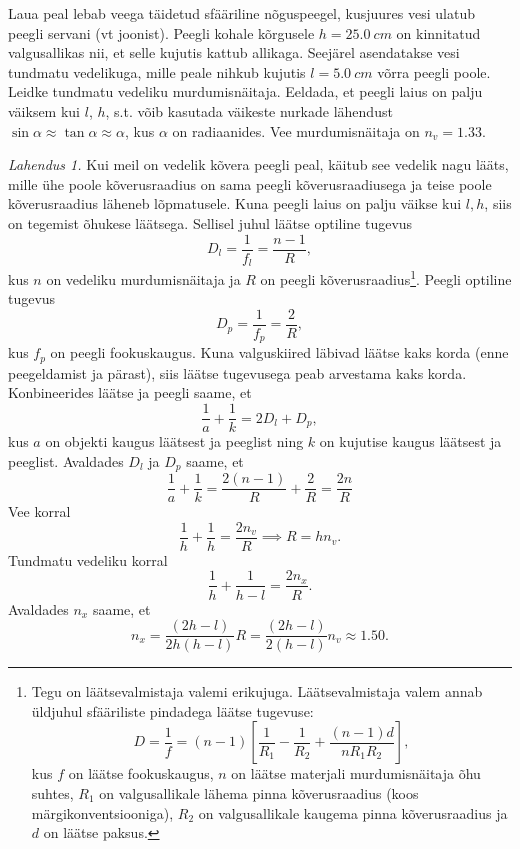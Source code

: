 
Laua peal lebab veega täidetud sfääriline nõguspeegel, kusjuures vesi ulatub peegli servani (vt joonist). Peegli kohale kõrgusele $h=\SI{25.0}{cm}$ on kinnitatud valgusallikas nii, et selle kujutis kattub allikaga. Seejärel asendatakse vesi tundmatu vedelikuga, mille peale nihkub kujutis $l=\SI{5.0}{cm}$ võrra peegli poole. Leidke tundmatu vedeliku murdumisnäitaja. Eeldada, et peegli laius on palju väiksem kui $l$, $h$, s.t. võib kasutada väikeste nurkade lähendust $\sin \alpha \approx \tan \alpha \approx \alpha$, kus $\alpha$ on radiaanides. Vee murdumisnäitaja on $n_v=\num{1.33}$.
\begin{figure}[h]
  \centering
\end{figure}
\vspace{-1.5em}


\hint

\solu
\emph{Lahendus 1.} Kui meil on vedelik kõvera peegli peal, käitub see vedelik nagu lääts, mille ühe poole kõverusraadius on sama peegli kõverusraadiusega ja teise poole kõverusraadius läheneb lõpmatusele. Kuna peegli laius on palju väikse kui $l,h$, siis on tegemist õhukese läätsega. Sellisel juhul läätse optiline tugevus
\[
  D_l=\frac{1}{f_l}=\frac{n-1}{R},
\]
kus $n$ on vedeliku murdumisnäitaja ja $R$ on peegli kõverusraadius\footnote{Tegu on läätsevalmistaja valemi erikujuga. Läätsevalmistaja valem annab üldjuhul sfääriliste pindadega läätse tugevuse:
  \[
    D=\frac{1}{f}=(n-1)\left[\frac{1}{R_1}-\frac{1}{R_2}+\frac{(n-1)d}{nR_1R_2}\right],
  \]
  kus $f$ on läätse fookuskaugus, $n$ on läätse materjali murdumisnäitaja õhu suhtes, $R_1$ on valgusallikale lähema pinna kõverusraadius (koos märgikonventsiooniga), $R_2$ on valgusallikale kaugema pinna kõverusraadius ja $d$ on läätse paksus.
}. Peegli optiline tugevus
\[
  D_p=\frac{1}{f_p}=\frac{2}{R},
\]
kus $f_p$ on peegli fookuskaugus. Kuna valguskiired läbivad läätse kaks korda (enne peegeldamist ja pärast), siis läätse tugevusega peab arvestama kaks korda. Konbineerides läätse ja peegli saame, et
\[
  \frac{1}{a}+\frac{1}{k}=2 D_l+D_p,
\]
kus $a$ on objekti kaugus läätsest ja peeglist ning $k$ on kujutise kaugus läätsest ja peeglist. Avaldades $D_l$ ja $D_p$ saame, et
\[
  \frac{1}{a}+\frac{1}{k}=\frac{2(n-1)}{R}+\frac{2}{R}=\frac{2n}{R}
\]
Vee korral
\[
  \frac{1}{h}+\frac{1}{h}=\frac{2 n_v }{R} \implies R=h n_v.
\]
Tundmatu vedeliku korral
\[
  \frac{1}{h}+\frac{1}{h-l}=\frac{2 n_x }{R}.
\]
Avaldades $n_x$ saame, et
\[
  n_x =\frac{(2h-l)}{2h(h-l)} R =\frac{(2h-l)}{2(h-l)} n_v \approx \num{1.50}.
\]

